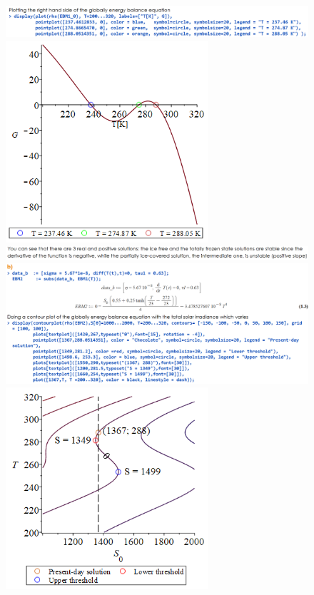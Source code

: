 \documentclass[11pt,a4paper]{article}
\begin{document}
\begin{figure}[H]
	\centering
	\includegraphics[width=150mm]{images/es2_2.PNG}
	
	\smallskip
	
	\includegraphics[width=75mm]{images/plot2.PNG}
	
	\smallskip
	
	\includegraphics[width=150mm]{images/es2_3.PNG}
	
	\bigskip
	
	\includegraphics[width=150mm]{images/es2_4.PNG}
	
	\smallskip
	
	\includegraphics[width=75mm]{images/plot3.PNG}
\end{figure}	
\end{document}
